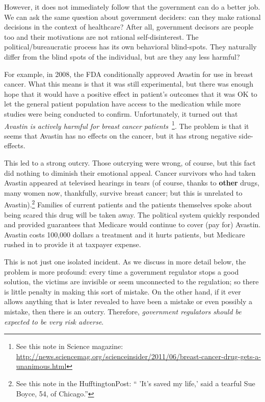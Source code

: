 However, it does not immediately follow that the government can do a better
job. We can ask the same question about government deciders: can they make
rational decisions in the context of healthcare? After all, government decisors
are people too and their motivations are not rational self-disinterest. The
political/bureaucratic process has its own behavioral blind-spots. They
naturally differ from the blind spots of the individual, but are they any less
harmful?

For example, in 2008, the FDA conditionally approved Avastin for use in breast
cancer. What this means is that it was still experimental, but there was enough
hope that it would have a positive effect in patient's outcomes that it was OK
to let the general patient population have access to the medication while more
studies were being conducted to confirm. Unfortunately, it turned out that
\emph{Avastin is actively harmful for breast cancer
patients}~\cite{avastin-harfmul}\footnote{See this note in Science magazine:
\url{http://news.sciencemag.org/scienceinsider/2011/06/breast-cancer-drug-gets-a-unanimous.html}}.
The problem is that it seems that Avastin has no effects on the cancer, but it
has strong negative side-effects.

This led to a strong outcry. Those outcrying were wrong, of course, but this
fact did nothing to diminish their emotional appeal. Cancer survivors who had
taken Avastin appeared at televised hearings in tears (of course, thanks to
\textbf{other} drugs, many women now, thankfully, survive breast cancer; but
this is unrelated to Avastin).\footnote{See this note in the HufftingtonPost:
`` 'It's saved my life,' said a tearful Sue Boyce, 54, of Chicago.''}
Families of current patients and the patients themselves spoke about being
scared this drug will be taken away. The political system quickly responded and
provided guarantees that Medicare would continue to cover (pay for) Avastin.
Avastin costs 100,000 dollars a treatment and it hurts patients, but Medicare
rushed in to provide it at taxpayer expense.

This is not just one isolated incident. As we discuss in more detail below, the
problem is more profound: every time a government regulator stops a good
solution, the victims are invisible or seem unconnected to the regulation; so
there is little penalty in making this sort of mistake. On the other hand, if
it ever allows anything that is later revealed to have been a mistake or even
possibly a mistake, then there is an outcry. Therefore, \emph{government
regulators should be expected to be very risk adverse}.

